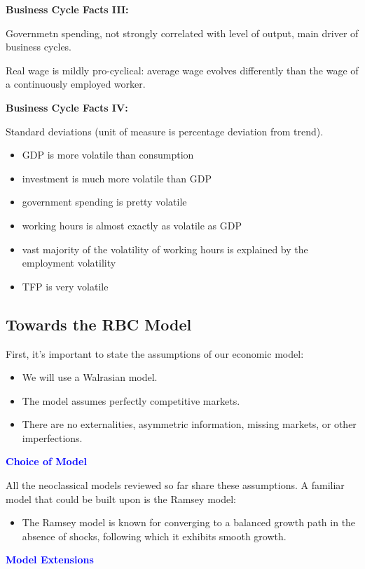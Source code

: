 \textbf{Business Cycle Facts III:}

Governmetn spending, not strongly correlated with level of output, main driver
of business cycles.

Real wage is mildly pro-cyclical: average wage evolves differently than the
wage of a continuously employed worker.

\textbf{\textbf{Business Cycle Facts IV:}}

Standard deviations (unit of measure is percentage deviation from
trend).

\begin{itemize}
  \item GDP is more volatile than consumption
  \item investment is much more volatile than GDP
  \item government spending is pretty volatile
  \item working hours is almost exactly as volatile as GDP
  \item vast majority of the volatility of working hours is explained by
  the employment volatility
  \item TFP is very volatile
\end{itemize}

\subsection{Towards the RBC Model}
First, it's important to state the assumptions of our economic model:
\begin{itemize}
  \item We will use a Walrasian model.
  \item The model assumes perfectly competitive markets.
  \item There are no externalities, asymmetric information, missing markets, or other imperfections.
\end{itemize}

\textcolor{blue}{\textbf{Choice of Model}}

All the neoclassical models reviewed so far share these assumptions. A familiar model that could be built upon is the Ramsey model:
\begin{itemize}
  \item The Ramsey model is known for converging to a balanced growth path in the absence of shocks, following which it exhibits smooth growth.
\end{itemize}

\textcolor{blue}{\textbf{Model Extensions}}

